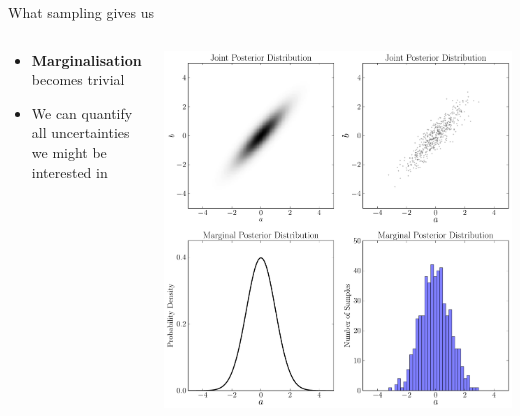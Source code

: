 \begin{frame}[t]{What sampling gives us}
\begin{columns}[T]
\begin{column}{0.35\textwidth}
  \vspace{20pt}
  \begin{itemize}
  \setlength{\itemsep}{10pt}
  \item {\bf Marginalisation} becomes trivial
  \item We can quantify all uncertainties we might be interested in
  \end{itemize}
\end{column}
\hfill
\begin{column}{0.5\textwidth}
  \hspace{-30pt}
  \includegraphics[scale=0.22]{marginalisation.pdf}
\end{column}

\end{columns}
\end{frame}


